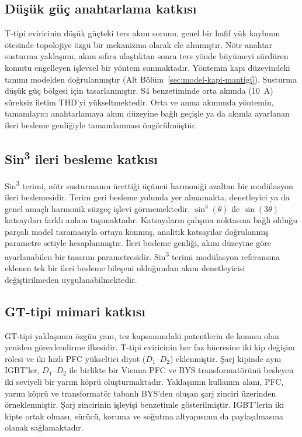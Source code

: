 \subsection{Düşük güç anahtarlama katkısı}

T-tipi eviricinin düşük güçteki ters akım sorunu, genel bir hafif yük kaybının ötesinde topolojiye özgü bir mekanizma olarak ele alınmıştır. Nötr anahtar susturma yaklaşımı, akım sıfıra ulaştıktan sonra ters yönde büyümeyi sürdüren komutu engelleyen işlevsel bir yöntem sunmaktadır. Yöntemin kapı düzeyindeki tanımı modelden doğrulanmıştır (Alt Bölüm~\ref{sec:model-kapi-mantigi}). Susturma düşük güç bölgesi için tasarlanmıştır. S4 benzetiminde orta akımda (\SI{10}{\ampere}) süreksiz iletim THD'yi yükseltmektedir. Orta ve anma akımında yöntemin, tamamlayıcı anahtarlamaya akım düzeyine bağlı geçişle ya da akımla ayarlanan ileri besleme genliğiyle tamamlanması öngörülmüştür.

\subsection{Sin\textsuperscript{3} ileri besleme katkısı}

Sin\textsuperscript{3} terimi, nötr susturmanın ürettiği üçüncü harmoniği azaltan bir modülasyon ileri beslemesidir. Terim geri besleme yolunda yer almamakta, denetleyici ya da genel amaçlı harmonik süzgeç işlevi görmemektedir. $\sin^3(\theta)$ ile $\sin(3\theta)$ katsayıları farklı anlam taşımaktadır. Katsayıların çalışma noktasına bağlı olduğu parçalı model taramasıyla ortaya konmuş, analitik katsayılar doğrulanmış parametre setiyle hesaplanmıştır. İleri besleme genliği, akım düzeyine göre ayarlanabilen bir tasarım parametresidir. Sin\textsuperscript{3} terimi modülasyon referansına eklenen tek bir ileri besleme bileşeni olduğundan akım denetleyicisi değiştirilmeden uygulanabilmektedir.

\subsection{GT-tipi mimari katkısı}

GT-tipi yaklaşımın özgün yanı, tez kapsamındaki patentlerin de konusu olan yeniden görevlendirme ilkesidir. T-tipi eviricinin her faz hücresine iki kip değişim rölesi ve iki hızlı PFC yükseltici diyot ($D_1$--$D_2$) eklenmiştir. Şarj kipinde aynı IGBT'ler, $D_1$--$D_2$ ile birlikte bir Vienna PFC ve BYS transformatörünü besleyen iki seviyeli bir yarım köprü oluşturmaktadır. Yaklaşımın kullanım alanı, PFC, yarım köprü ve transformatör tabanlı BYS'den oluşan şarj zinciri üzerinden örneklenmiştir. Şarj zincirinin işleyişi benzetimle gösterilmiştir. IGBT'lerin iki kipte ortak olması, sürücü, koruma ve soğutma altyapısının da paylaşılmasına olanak sağlamaktadır.

